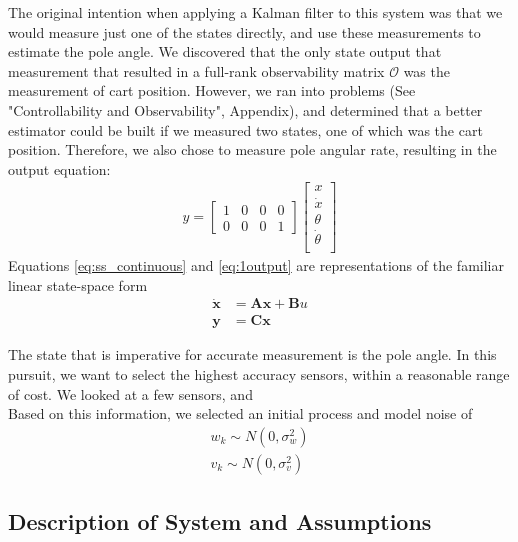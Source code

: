 \documentclass{article}
\newcommand{\matr}[1]{\bm{#1}}     %
\begin{document}
The original intention when applying a Kalman filter to this system was that we would measure just one of the states directly, and use these measurements to estimate the pole angle. We discovered that the only state output that measurement that resulted in a full-rank observability matrix $\mathcal{O}$ was the measurement of cart position. However, we ran into problems (See "Controllability and Observability", Appendix), and determined that a better estimator could be built if we measured two states, one of which was the cart position. Therefore, we also chose to measure pole angular rate, resulting in the output equation:
\begin{align}
y = \begin{bmatrix}
1 & 0 & 0 & 0 \\
0 & 0 & 0 & 1
\end{bmatrix} \begin{bmatrix}
	x \\
	\dot{x} \\
	\theta \\
	\dot{\theta} \\
\end{bmatrix}
\label{eq:1output}
\end{align}
Equations \ref{eq:ss_continuous} and \ref{eq:1output} are representations of the familiar linear state-space form
\begin{equation}
\begin{aligned}
\matr{\dot{x}} &= \matr{A}\matr{x} + \matr{B}u \\
\matr{y} &= \matr{C}\matr{x}
\end{aligned}
\end{equation}

The state that is imperative for accurate measurement is the pole angle. In this pursuit, we want to select the highest accuracy sensors, within a reasonable range of cost. We looked at a few sensors, and \\

Based on this information, we selected an initial process and model noise of
\begin{equation}
\begin{aligned}
w_k \sim N(0,\sigma_w^2) \\
v_k \sim N(0,\sigma_v^2)
\end{aligned}
\end{equation}
\subsection{Description of System and Assumptions}
\end{document}
